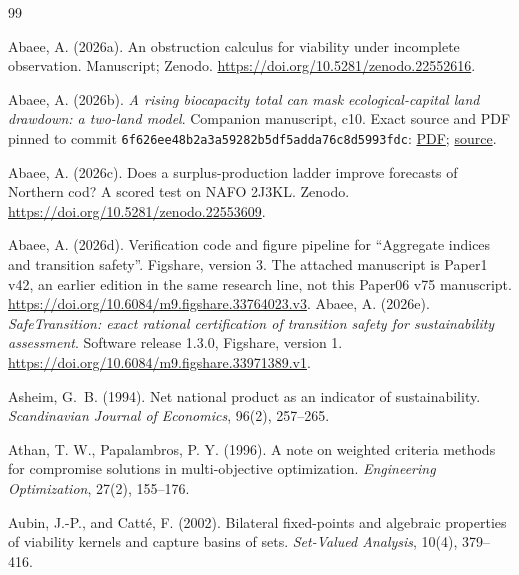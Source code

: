 \begin{thebibliography}{99}
\makeatletter\renewcommand{\@biblabel}[1]{}\makeatother

 Abaee, A. (2026a). An obstruction calculus for viability under incomplete observation. Manuscript; Zenodo. \url{https://doi.org/10.5281/zenodo.22552616}.

 Abaee, A. (2026b). \emph{A rising biocapacity total can mask ecological-capital land drawdown: a two-land model}. Companion manuscript, c10. Exact source and PDF pinned to commit \texttt{6f626ee48b2a3a59282b5df5adda76c8d5993fdc}: \href{https://github.com/MIKEAA2020/general-sustainability/blob/6f626ee48b2a3a59282b5df5adda76c8d5993fdc/agent%202%20productivity%20illusion/output_v45_ecomod_continued_10_gemini38_v4base_si_review_20261026/ecomod_continued_10.pdf}{PDF}; \href{https://github.com/MIKEAA2020/general-sustainability/blob/6f626ee48b2a3a59282b5df5adda76c8d5993fdc/agent%202%20productivity%20illusion/output_v45_ecomod_continued_10_gemini38_v4base_si_review_20261026/ecomod_continued_10.tex}{source}.

 Abaee, A. (2026c). Does a surplus-production ladder improve forecasts of Northern cod? A scored test on NAFO 2J3KL. Zenodo. \url{https://doi.org/10.5281/zenodo.22553609}.

 Abaee, A. (2026d). Verification code and figure pipeline for ``Aggregate indices and transition safety''. Figshare, version 3. The attached manuscript is Paper1 v42, an earlier edition in the same research line, not this Paper06 v75 manuscript. \url{https://doi.org/10.6084/m9.figshare.33764023.v3}.
 Abaee, A. (2026e). \emph{SafeTransition: exact rational certification of transition safety for sustainability assessment}. Software release 1.3.0, Figshare, version 1. \url{https://doi.org/10.6084/m9.figshare.33971389.v1}.

 Asheim, G.~B. (1994). Net national product as an indicator of sustainability. \emph{Scandinavian Journal of Economics}, 96(2), 257--265.

 Athan, T. W., Papalambros, P. Y. (1996). A note on weighted criteria methods for compromise solutions in multi-objective optimization. \emph{Engineering Optimization}, 27(2), 155--176.

 Aubin, J.-P., and Catt\'e, F. (2002). Bilateral fixed-points and algebraic properties of viability kernels and capture basins of sets. \emph{Set-Valued Analysis}, 10(4), 379--416.


\end{thebibliography}
